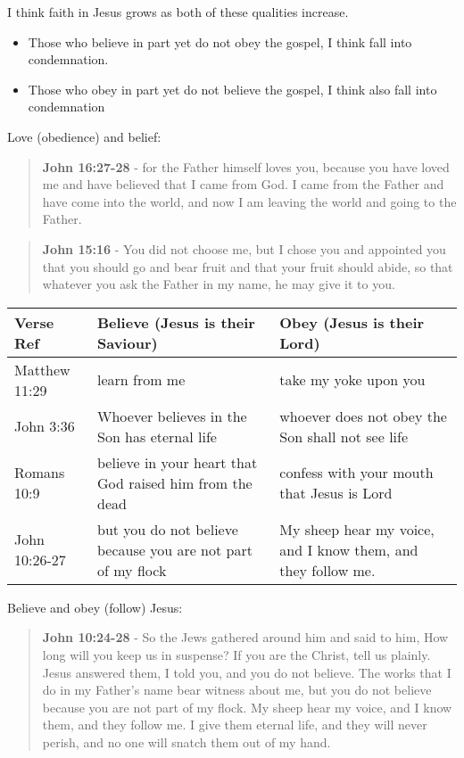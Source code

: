 \documentclass[11pt]{article}
\begin{document}
I think faith in Jesus grows as both of these qualities increase.

\begin{itemize}
\item Those who believe in part yet do not obey the gospel, I think fall into condemnation.
\item Those who obey in part yet do not believe the gospel, I think also fall into condemnation
\end{itemize}

Love (obedience) and belief:

\begin{quote}
\textbf{John 16:27-28} - for the Father himself loves you, because you have loved me and have believed that I came from God. I came from the Father and have come into the world, and now I am leaving the world and going to the Father.
\end{quote}

\begin{quote}
\textbf{John 15:16} - You did not choose me, but I chose you and appointed you that you should go and bear fruit and that your fruit should abide, so that whatever you ask the Father in my name, he may give it to you.
\end{quote}

\begin{center}
\begin{tabular}{lll}
Verse Ref & Believe (Jesus is their Saviour) & Obey (Jesus is their Lord)\\[0pt]
\hline
Matthew 11:29 & learn from me & take my yoke upon you\\[0pt]
John 3:36 & Whoever believes in the Son has eternal life & whoever does not obey the Son shall not see life\\[0pt]
Romans 10:9 & believe in your heart that God raised him from the dead & confess with your mouth that Jesus is Lord\\[0pt]
John 10:26-27 & but you do not believe because you are not part of my flock & My sheep hear my voice, and I know them, and they follow me.\\[0pt]
\end{tabular}
\end{center}

Believe and obey (follow) Jesus:

\begin{quote}
\textbf{John 10:24-28} - So the Jews gathered around him and said to him, How long will you keep us in suspense? If you are the Christ, tell us plainly. Jesus answered them, I told you, and you do not believe. The works that I do in my Father's name bear witness about me, but you do not believe because you are not part of my flock. My sheep hear my voice, and I know them, and they follow me. I give them eternal life, and they will never perish, and no one will snatch them out of my hand.
\end{quote}
\end{document}
